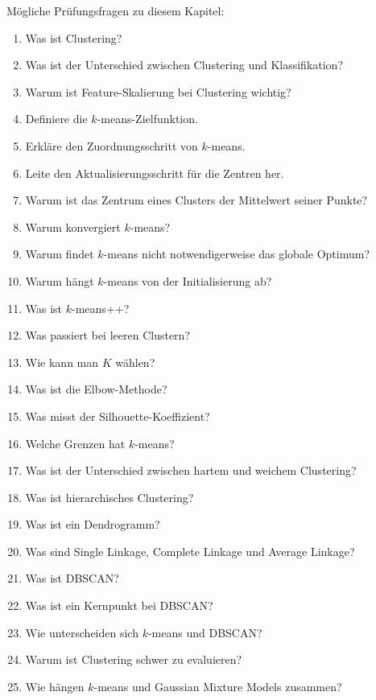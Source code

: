 \begin{examtipbox}
Mögliche Prüfungsfragen zu diesem Kapitel:

\begin{enumerate}
    \item Was ist Clustering?
    \item Was ist der Unterschied zwischen Clustering und Klassifikation?
    \item Warum ist Feature-Skalierung bei Clustering wichtig?
    \item Definiere die \(k\)-means-Zielfunktion.
    \item Erkläre den Zuordnungsschritt von \(k\)-means.
    \item Leite den Aktualisierungsschritt für die Zentren her.
    \item Warum ist das Zentrum eines Clusters der Mittelwert seiner Punkte?
    \item Warum konvergiert \(k\)-means?
    \item Warum findet \(k\)-means nicht notwendigerweise das globale Optimum?
    \item Warum hängt \(k\)-means von der Initialisierung ab?
    \item Was ist \(k\)-means++?
    \item Was passiert bei leeren Clustern?
    \item Wie kann man \(K\) wählen?
    \item Was ist die Elbow-Methode?
    \item Was misst der Silhouette-Koeffizient?
    \item Welche Grenzen hat \(k\)-means?
    \item Was ist der Unterschied zwischen hartem und weichem Clustering?
    \item Was ist hierarchisches Clustering?
    \item Was ist ein Dendrogramm?
    \item Was sind Single Linkage, Complete Linkage und Average Linkage?
    \item Was ist DBSCAN?
    \item Was ist ein Kernpunkt bei DBSCAN?
    \item Wie unterscheiden sich \(k\)-means und DBSCAN?
    \item Warum ist Clustering schwer zu evaluieren?
    \item Wie hängen \(k\)-means und Gaussian Mixture Models zusammen?
\end{enumerate}
\end{examtipbox}